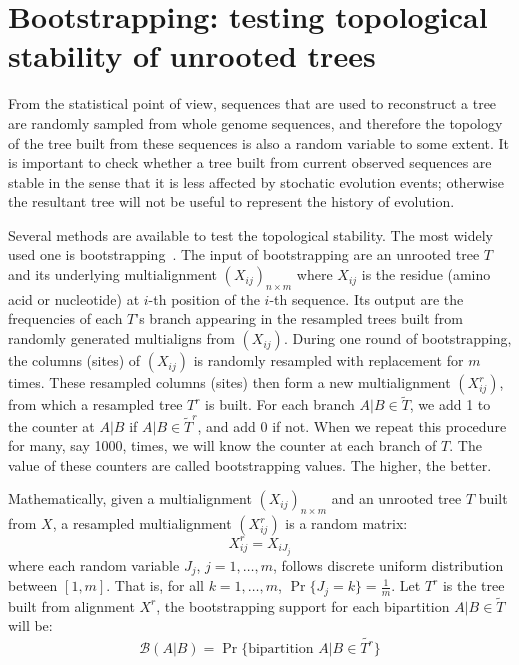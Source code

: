\section{Bootstrapping: testing topological stability of unrooted trees}\label{sec:bootsrap}

From the statistical point of view, sequences that are used to reconstruct a tree are randomly sampled
from whole genome sequences, and therefore the topology of the tree
built from these sequences is also a random variable to some extent.
It is important to check whether a tree built from current observed sequences are
stable in the sense that it is less affected by stochatic evolution events;
otherwise the resultant tree will not be useful to represent the history of evolution.

Several methods are available to test the topological stability. The most widely used one
is bootstrapping~\cite{efron79,felsenstein85}. The input of bootstrapping are
an unrooted tree $T$ and its underlying multialignment $(X_{ij})_{n\times m}$
where $X_{ij}$ is the residue (amino acid or nucleotide) at $i$-th position of the $i$-th sequence.
Its output are the frequencies of each $T$'s branch appearing in the resampled trees built
from randomly generated multialigns from $(X_{ij})$. During one round of bootstrapping,
the columns (sites) of $(X_{ij})$ is randomly resampled with replacement for $m$ times. These resampled
columns (sites) then form a new multialignment $(X^r_{ij})$, from which a resampled tree $T^r$ is built.
For each branch $A|B\in\tilde{T}$, we add 1 to the counter at $A|B$ if $A|B\in\tilde{T}^r$, and add 0 if not.
When we repeat this procedure for many, say 1000, times, we will know the counter at each
branch of $T$. The value of these counters are called bootstrapping values.
The higher, the better.

Mathematically, given a multialignment
$(X_{ij})_{n\times m}$ and an unrooted tree $T$ built from $X$, a resampled multialignment $(X^r_{ij})$
is a random matrix:
\begin{equation}
X^r_{ij}=X_{iJ_j}
\end{equation}
where each random variable $J_j$, $j=1,\ldots,m$, follows discrete uniform distribution between $[1,m]$. That is, for all $k=1,\ldots,m$,
$\Pr\{J_j=k\}=\frac{1}{m}$. Let $T^r$ is the tree built from alignment $X^r$, the
bootstrapping support for each bipartition $A|B\in\tilde{T}$ will be:
\begin{equation}
\mathcal{B}(A|B)=\Pr\{\mbox{bipartition $A|B\in\tilde{T^r}$}\}
\end{equation}

